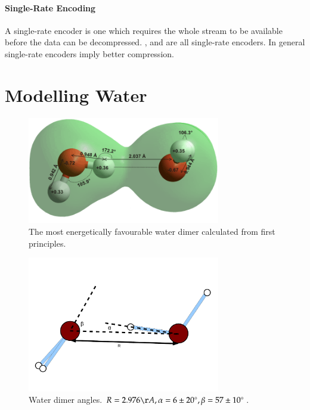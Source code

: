 \documentclass[a4paper]{report}
\newcommand{\degree}{\ensuremath{^\circ}}
\begin{document}
\paragraph{Single-Rate Encoding}
A single-rate encoder is one which requires the whole stream to be available
before the data can be decompressed. \citet{omeltchenko2000sls},
\citet{gumholdcomp} and \citet{merrycomp} are all single-rate encoders. In
general single-rate encoders imply better compression.


\section{Modelling Water}
\label{sec:modelling-water}

\begin{figure}[h]
  \centering
  \includegraphics[width=0.75\textwidth]{images/h402}
  \caption{The most energetically favourable water dimer calculated from first
    principles. \citep{watermolecule}}
  \label{fig:dimer}
\end{figure}

\begin{figure}[h]
  \centering
  \includegraphics[trim = 10mm 30mm 10mm 45mm, clip, width=0.75\textwidth]{images/dimer-angle}
  \caption{Water dimer angles. $R = 2.976\AA, \alpha = 6 \pm 20\degree, \beta =
    57 \pm 10\degree$.}
  \label{fig:dimer-angle}
\end{figure}
\end{document}

